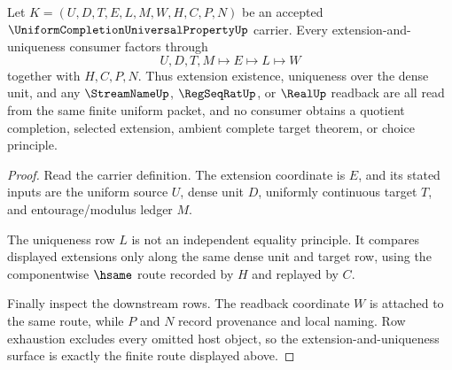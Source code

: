 \begin{theorem}
\label{thm:uniform-completion-universal-property-extension-uniqueness}
Let $K=(U,D,T,E,L,M,W,H,C,P,N)$ be an accepted $\UniformCompletionUniversalPropertyUp$ carrier. Every extension-and-uniqueness consumer factors through
$$
U,D,T,M\longmapsto E\longmapsto L\longmapsto W
$$
together with $H,C,P,N$. Thus extension existence, uniqueness over the dense unit, and any $\StreamNameUp$, $\RegSeqRatUp$, or $\RealUp$ readback are all read from the same finite uniform packet, and no consumer obtains a quotient completion, selected extension, ambient complete target theorem, or choice principle.
\end{theorem}
\begin{proof}
Read the carrier definition. The extension coordinate is $E$, and its stated inputs are the uniform source $U$, dense unit $D$, uniformly continuous target $T$, and entourage/modulus ledger $M$.

The uniqueness row $L$ is not an independent equality principle. It compares displayed extensions only along the same dense unit and target row, using the componentwise $\hsame$ route recorded by $H$ and replayed by $C$.

Finally inspect the downstream rows. The readback coordinate $W$ is attached to the same route, while $P$ and $N$ record provenance and local naming. Row exhaustion excludes every omitted host object, so the extension-and-uniqueness surface is exactly the finite route displayed above.
\end{proof}




